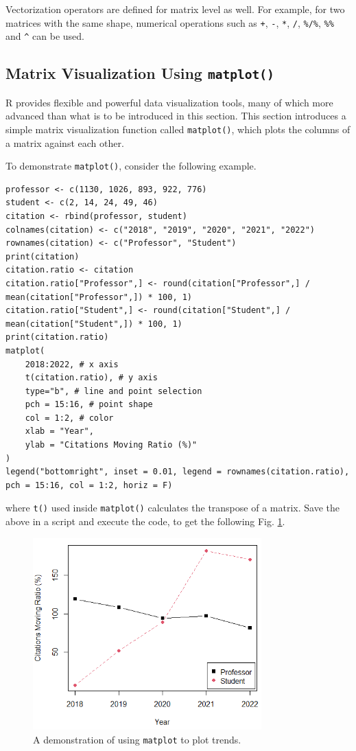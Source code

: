 Vectorization operators are defined for matrix level as well. For example, for two matrices with the same shape, numerical operations such as  \verb|+|, \verb|-|, \verb|*|, \verb|/|, \verb|%/%|, \verb|%%| and \verb|^| can be used.

\subsection{Matrix Visualization Using \texttt{matplot()}}

R provides flexible and powerful data visualization tools, many of which more advanced than what is to be introduced in this section. This section introduces a simple matrix visualization function called \verb|matplot()|, which plots the columns of a matrix against each other.

To demonstrate \verb|matplot()|, consider the following example.
\begin{lstlisting}
professor <- c(1130, 1026, 893, 922, 776)
student <- c(2, 14, 24, 49, 46)
citation <- rbind(professor, student)
colnames(citation) <- c("2018", "2019", "2020", "2021", "2022")
rownames(citation) <- c("Professor", "Student")
print(citation)
citation.ratio <- citation
citation.ratio["Professor",] <- round(citation["Professor",] / mean(citation["Professor",]) * 100, 1)
citation.ratio["Student",] <- round(citation["Student",] / mean(citation["Student",]) * 100, 1)
print(citation.ratio)
matplot(
	2018:2022, # x axis
	t(citation.ratio), # y axis
	type="b", # line and point selection
	pch = 15:16, # point shape
	col = 1:2, # color
	xlab = "Year",
	ylab = "Citations Moving Ratio (%)"
)
legend("bottomright", inset = 0.01, legend = rownames(citation.ratio), pch = 15:16, col = 1:2, horiz = F)
\end{lstlisting}
where \verb|t()| used inside \verb|matplot()| calculates the transpose of a matrix. Save the above in a script and execute the code, to get the following Fig. \ref{ch:r1:fig:matplot_demo}.
\begin{figure}
	\centering
	\includegraphics[width=250pt]{chapters/ch-r/figures/matplot_demo.png}
	\caption{A demonstration of using \texttt{matplot} to plot trends.} \label{ch:r1:fig:matplot_demo}
\end{figure}

